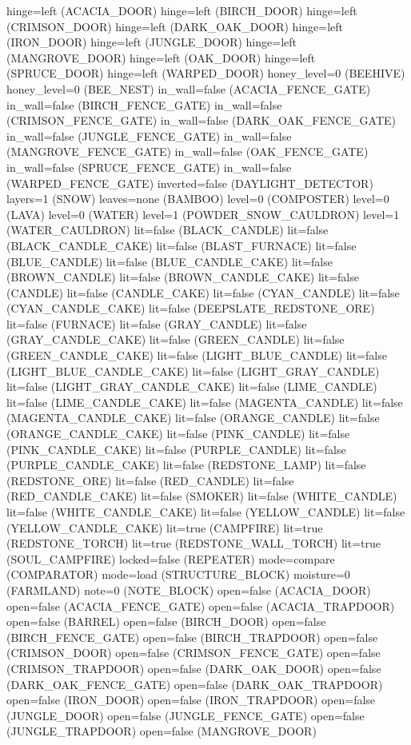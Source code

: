 \documentclass[11pt]{article}
\begin{document}
hinge=left (ACACIA_DOOR)
hinge=left (BIRCH_DOOR)
hinge=left (CRIMSON_DOOR)
hinge=left (DARK_OAK_DOOR)
hinge=left (IRON_DOOR)
hinge=left (JUNGLE_DOOR)
hinge=left (MANGROVE_DOOR)
hinge=left (OAK_DOOR)
hinge=left (SPRUCE_DOOR)
hinge=left (WARPED_DOOR)
honey_level=0 (BEEHIVE)
honey_level=0 (BEE_NEST)
in_wall=false (ACACIA_FENCE_GATE)
in_wall=false (BIRCH_FENCE_GATE)
in_wall=false (CRIMSON_FENCE_GATE)
in_wall=false (DARK_OAK_FENCE_GATE)
in_wall=false (JUNGLE_FENCE_GATE)
in_wall=false (MANGROVE_FENCE_GATE)
in_wall=false (OAK_FENCE_GATE)
in_wall=false (SPRUCE_FENCE_GATE)
in_wall=false (WARPED_FENCE_GATE)
inverted=false (DAYLIGHT_DETECTOR)
layers=1 (SNOW)
leaves=none (BAMBOO)
level=0 (COMPOSTER)
level=0 (LAVA)
level=0 (WATER)
level=1 (POWDER_SNOW_CAULDRON)
level=1 (WATER_CAULDRON)
lit=false (BLACK_CANDLE)
lit=false (BLACK_CANDLE_CAKE)
lit=false (BLAST_FURNACE)
lit=false (BLUE_CANDLE)
lit=false (BLUE_CANDLE_CAKE)
lit=false (BROWN_CANDLE)
lit=false (BROWN_CANDLE_CAKE)
lit=false (CANDLE)
lit=false (CANDLE_CAKE)
lit=false (CYAN_CANDLE)
lit=false (CYAN_CANDLE_CAKE)
lit=false (DEEPSLATE_REDSTONE_ORE)
lit=false (FURNACE)
lit=false (GRAY_CANDLE)
lit=false (GRAY_CANDLE_CAKE)
lit=false (GREEN_CANDLE)
lit=false (GREEN_CANDLE_CAKE)
lit=false (LIGHT_BLUE_CANDLE)
lit=false (LIGHT_BLUE_CANDLE_CAKE)
lit=false (LIGHT_GRAY_CANDLE)
lit=false (LIGHT_GRAY_CANDLE_CAKE)
lit=false (LIME_CANDLE)
lit=false (LIME_CANDLE_CAKE)
lit=false (MAGENTA_CANDLE)
lit=false (MAGENTA_CANDLE_CAKE)
lit=false (ORANGE_CANDLE)
lit=false (ORANGE_CANDLE_CAKE)
lit=false (PINK_CANDLE)
lit=false (PINK_CANDLE_CAKE)
lit=false (PURPLE_CANDLE)
lit=false (PURPLE_CANDLE_CAKE)
lit=false (REDSTONE_LAMP)
lit=false (REDSTONE_ORE)
lit=false (RED_CANDLE)
lit=false (RED_CANDLE_CAKE)
lit=false (SMOKER)
lit=false (WHITE_CANDLE)
lit=false (WHITE_CANDLE_CAKE)
lit=false (YELLOW_CANDLE)
lit=false (YELLOW_CANDLE_CAKE)
lit=true (CAMPFIRE)
lit=true (REDSTONE_TORCH)
lit=true (REDSTONE_WALL_TORCH)
lit=true (SOUL_CAMPFIRE)
locked=false (REPEATER)
mode=compare (COMPARATOR)
mode=load (STRUCTURE_BLOCK)
moisture=0 (FARMLAND)
note=0 (NOTE_BLOCK)
open=false (ACACIA_DOOR)
open=false (ACACIA_FENCE_GATE)
open=false (ACACIA_TRAPDOOR)
open=false (BARREL)
open=false (BIRCH_DOOR)
open=false (BIRCH_FENCE_GATE)
open=false (BIRCH_TRAPDOOR)
open=false (CRIMSON_DOOR)
open=false (CRIMSON_FENCE_GATE)
open=false (CRIMSON_TRAPDOOR)
open=false (DARK_OAK_DOOR)
open=false (DARK_OAK_FENCE_GATE)
open=false (DARK_OAK_TRAPDOOR)
open=false (IRON_DOOR)
open=false (IRON_TRAPDOOR)
open=false (JUNGLE_DOOR)
open=false (JUNGLE_FENCE_GATE)
open=false (JUNGLE_TRAPDOOR)
open=false (MANGROVE_DOOR)
\end{document}
